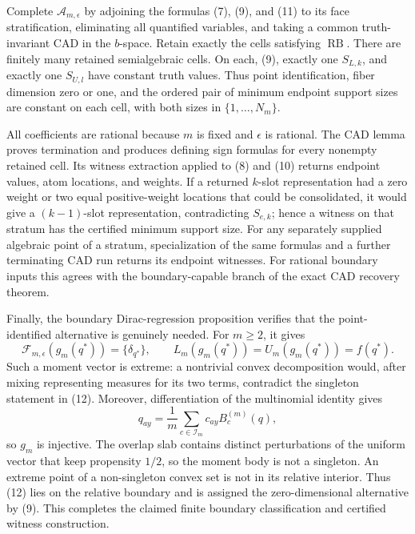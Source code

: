 Complete \(\mathcal A_{m,\epsilon}\) by adjoining the formulas (7), (9), and (11) to its face stratification, eliminating all quantified variables, and taking a common truth-invariant CAD in the \(b\)-space.  Retain exactly the cells satisfying \(\operatorname{RB}\).  There are finitely many retained semialgebraic cells.  On each, (9), exactly one \(S_{L,k}\), and exactly one \(S_{U,l}\) have constant truth values.  Thus point identification, fiber dimension zero or one, and the ordered pair of minimum endpoint support sizes are constant on each cell, with both sizes in \(\{1,\ldots,N_m\}\).

All coefficients are rational because \(m\) is fixed and \(\epsilon\) is rational.  The CAD lemma proves termination and produces defining sign formulas for every nonempty retained cell.  Its witness extraction applied to (8) and (10) returns endpoint values, atom locations, and weights.  If a returned \(k\)-slot representation had a zero weight or two equal positive-weight locations that could be consolidated, it would give a \((k-1)\)-slot representation, contradicting \(S_{e,k}\); hence a witness on that stratum has the certified minimum support size.  For any separately supplied algebraic point of a stratum, specialization of the same formulas and a further terminating CAD run returns its endpoint witnesses.  For rational boundary inputs this agrees with the boundary-capable branch of the exact CAD recovery theorem.

Finally, the boundary Dirac-regression proposition verifies that the point-identified alternative is genuinely needed.  For \(m\geq2\), it gives
\[
 \mathcal F_{m,\epsilon}(g_m(q^*))=\{\delta_{q^*}\},
 \qquad L_m(g_m(q^*))=U_m(g_m(q^*))=f(q^*).
\tag{12}
\]
Such a moment vector is extreme: a nontrivial convex decomposition would, after mixing representing measures for its two terms, contradict the singleton statement in (12).  Moreover, differentiation of the multinomial identity gives
\[
 q_{ay}=\frac1m\sum_{c\in\mathcal I_m}c_{ay}B_c^{(m)}(q),
\tag{13}
\]
so \(g_m\) is injective.  The overlap slab contains distinct perturbations of the uniform vector that keep propensity \(1/2\), so the moment body is not a singleton.  An extreme point of a non-singleton convex set is not in its relative interior.  Thus (12) lies on the relative boundary and is assigned the zero-dimensional alternative by (9).  This completes the claimed finite boundary classification and certified witness construction.